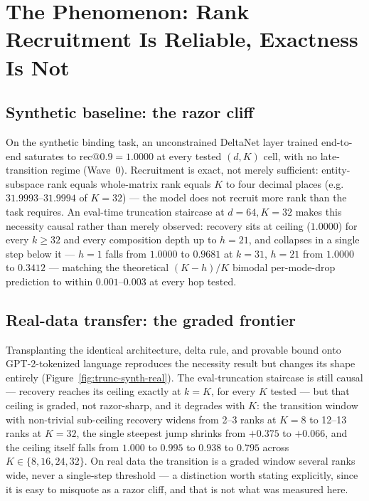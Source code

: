\section{The Phenomenon: Rank Recruitment Is Reliable, Exactness Is Not}
\label{sec:phenomenon}

\subsection{Synthetic baseline: the razor cliff}

On the synthetic binding task, an unconstrained DeltaNet layer trained
end-to-end saturates to $\mathrm{rec@0.9}=1.0000$ at every tested $(d,K)$
cell, with no late-transition regime (Wave~0). Recruitment is exact, not
merely sufficient: entity-subspace rank equals whole-matrix rank equals
$K$ to four decimal places (e.g.\ $31.9993$--$31.9994$ of $K{=}32$) --- the
model does not recruit more rank than the task requires. An eval-time
truncation staircase at $d{=}64,K{=}32$ makes this necessity causal rather
than merely observed: recovery sits at ceiling ($1.0000$) for every
$k\geq32$ and every composition depth up to $h{=}21$, and collapses in a
single step below it --- $h{=}1$ falls from $1.0000$ to $0.9681$ at
$k{=}31$, $h{=}21$ from $1.0000$ to $0.3412$ --- matching the theoretical
$(K{-}h)/K$ bimodal per-mode-drop prediction to within $0.001$--$0.003$ at
every hop tested.

\subsection{Real-data transfer: the graded frontier}

Transplanting the identical architecture, delta rule, and provable bound
onto GPT-2-tokenized language reproduces the necessity result but changes
its shape entirely (Figure~\ref{fig:trunc-synth-real}). The eval-truncation
staircase is still causal --- recovery reaches its ceiling exactly at
$k{=}K$, for every $K$ tested --- but that ceiling is graded, not
razor-sharp, and it degrades with $K$: the transition window with
non-trivial sub-ceiling recovery widens from 2--3 ranks at $K{=}8$ to
12--13 ranks at $K{=}32$, the single steepest jump shrinks from $+0.375$ to
$+0.066$, and the ceiling itself falls from $1.000$ to $0.995$ to $0.938$
to $0.795$ across $K\in\{8,16,24,32\}$. On real data the transition is a
graded window several ranks wide, never a single-step threshold --- a
distinction worth stating explicitly, since it is easy to misquote as a
razor cliff, and that is not what was measured here.

